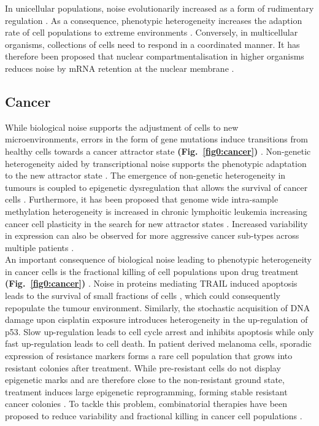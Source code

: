In unicellular populations, noise evolutionarily increased as a form of rudimentary regulation \citep{Wolf2015}. As a consequence, phenotypic heterogeneity increases the adaption rate of cell populations to extreme environments \cite{Bodi2017}. Conversely, in multicellular organisms, collections of cells need to respond in a coordinated manner. It has therefore been proposed that nuclear compartmentalisation in higher organisms reduces noise by mRNA retention at the nuclear membrane \citep{Battich2013, Stoeger2016}.

\subsection{Cancer}

While biological noise supports the adjustment of cells to new microenvironments, errors in the form of gene mutations induce transitions from healthy cells towards a cancer attractor state \textbf{(Fig.~\ref{fig0:cancer})} \citep{Marusyk2012}. Non-genetic heterogeneity aided by transcriptional noise supports the phenotypic adaptation to the new attractor state \citep{Jia2017}. The emergence of non-genetic heterogeneity in tumours is coupled to epigenetic dysregulation that allows the survival of cancer cells \citep{Timp2013}. Furthermore, it has been proposed that genome wide intra-sample methylation heterogeneity is increased in chronic lymphoitic leukemia increasing cancer cell plasticity in the search for new attractor states \citep{Landau2014}. Increased variability in expression can also be observed for more aggressive cancer sub-types across multiple patients \citep{Ecker2015}. \\

An important consequence of biological noise leading to phenotypic heterogeneity in cancer cells is the fractional killing of cell populations upon drug treatment \textbf{(Fig.~\ref{fig0:cancer})} \citep{Flusberg2015}. Noise in proteins mediating \Gls{TRAIL} induced apoptosis leads to the survival of small fractions of cells \citep{Spencer2009}, which could consequently repopulate the tumour environment. Similarly, the stochastic acquisition of DNA damage upon cisplatin exposure introduces heterogeneity in the up-regulation of p53. Slow up-regulation leads to cell cycle arrest and inhibits apoptosis while only fast up-regulation leads to cell death. In patient derived melanoma cells, sporadic expression of resistance markers forms a rare cell population that grows into resistant colonies after treatment. While pre-resistant cells do not display epigenetic marks and are therefore close to the non-resistant ground state, treatment induces large epigenetic reprogramming, forming stable resistant cancer colonies \citep{Shaffer2017}. To tackle this problem, combinatorial therapies have been proposed to reduce variability and fractional killing in cancer cell populations \cite{Paek2016, Roux2015}.\\


